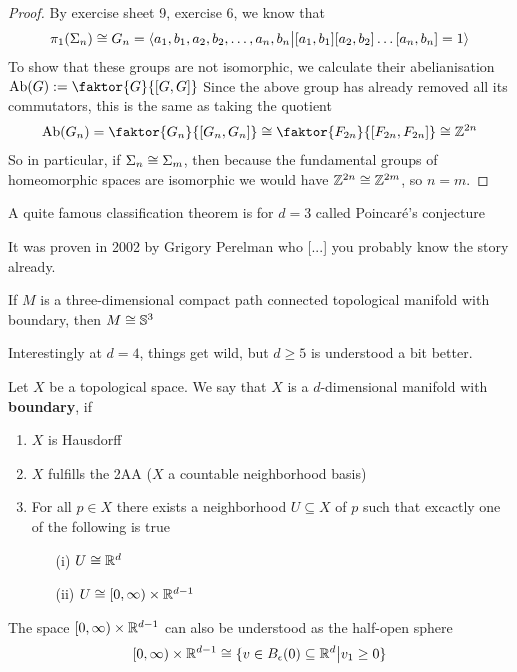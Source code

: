 \begin{proof}
By exercise sheet 9, exercise 6, we know that
\begin{align*}
  \pi_1(\Sigma_n) \cong G_n= \langle a_1,b_1,a_2,b_2, \ldots, a_n,b_n \big\vert[a_1,b_1][a_2,b_2]\dots[a_n,b_n] = 1\rangle 
\end{align*}
To show that these groups are not isomorphic, we calculate their abelianisation $\text{Ab}(G) := \faktor{G}{[G,G]}$
Since the above group has already removed all its commutators, this is the same as taking the quotient
\begin{align*}
  \text{Ab}(G_n) = \faktor{G_n}{[G_n,G_n]} \iso \faktor{F_{2n}}{[F_{2n},F_{2n}]} \iso \Z^{2n}
\end{align*}
So in particular, if $\Sigma_n \cong \Sigma_m$, then because the fundamental groups of homeomorphic spaces are isomorphic we would have $\mathbb{Z}^{2n} \cong \mathbb{Z}^{2m}$, so $n = m$.
\end{proof}


A quite famous classification theorem is for $d=3$ called Poincaré's conjecture

It was proven in 2002 by Grigory Perelman who [...] you probably know the story already.

\begin{thm}[Perelman]
If $M$ is a three-dimensional compact path connected topological manifold with boundary, then $M\cong \mathbb{S}^{3}$
\end{thm}

Interestingly at $d=4$, things get wild, but $d \geq 5$ is understood a bit better.


\begin{dfn}[]
Let $X$ be a topological space. We say that $X$ is a $d$-dimensional manifold with \textbf{boundary}, if
  \begin{enumerate}
    \item $X$ is Hausdorff
    \item $X$ fulfills the 2AA ($X$ a countable neighborhood basis)
    \item For all $p \in X$ there exists a neighborhood $U \subseteq X$ of $p$ such that excactly one of the following is true
      \begin{enumerate}
        \item[(i)] $U \cong \mathbb{R}^{d}$
        \item[(ii)] $U \cong [0,\infty) \times \mathbb{R}^{d-1}$
      \end{enumerate}
  \end{enumerate}
\end{dfn}
The space $[0,\infty) \times \mathbb{R}^{d-1}$ can also be understood as the half-open sphere
\begin{align*}
  [0,\infty) \times \mathbb{R}^{d-1} \cong \{v \in B_{\epsilon}(0) \subseteq \mathbb{R}^{d} \big\vert v_1 \geq 0\}
\end{align*}

